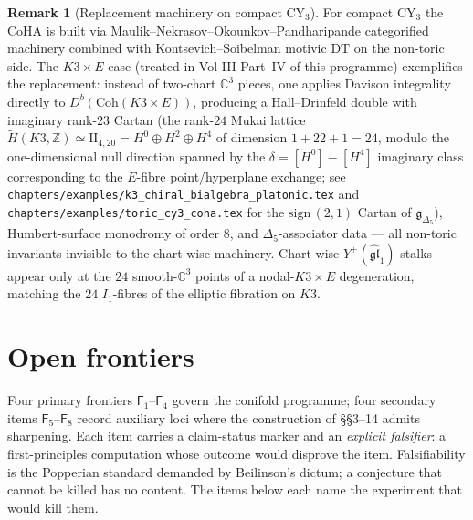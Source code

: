 \documentclass[11pt]{amsart}
\theoremstyle{definition}
\newtheorem{remark}[theorem]{Remark}
\providecommand{\bC}{\mathbb{C}}
\providecommand{\Z}{\mathbb{Z}}
\providecommand{\fgl}{\mathfrak{gl}}
\providecommand{\fg}{\mathfrak{g}}
\begin{document}
\begin{remark}[Replacement machinery on compact CY$_3$]
\label{rem:mnop-replacement}
For compact CY$_3$ the CoHA is built via Maulik--Nekrasov--Okounkov--Pandharipande
categorified machinery combined with Kontsevich--Soibelman motivic DT
on the non-toric side. The $K3 \times E$ case (treated in Vol III Part~IV
of this programme) exemplifies the replacement: instead of two-chart
$\bC^3$ pieces, one applies Davison integrality directly to
$D^b(\mathrm{Coh}(K3 \times E))$, producing a Hall--Drinfeld double with
imaginary rank-$23$ Cartan (the rank-$24$ Mukai lattice $\widetilde H(K3,\Z)
\simeq \mathrm{II}_{4,20} = H^0 \oplus H^2 \oplus H^4$ of dimension $1 + 22 + 1 = 24$,
modulo the one-dimensional null direction spanned by the
$\delta = [H^0] - [H^4]$ imaginary class corresponding to the
$E$-fibre point/hyperplane exchange; see
\texttt{chapters/examples/k3\_chiral\_bialgebra\_platonic.tex} and
\texttt{chapters/examples/toric\_cy3\_coha.tex} for the
$\mathrm{sign}\,(2,1)$ Cartan of $\fg_{\Delta_5}$), Humbert-surface monodromy
of order $8$, and
$\Delta_5$-associator data — all non-toric invariants invisible to the
chart-wise machinery. Chart-wise $Y^+(\widehat{\fgl}_1)$ stalks appear
only at the $24$ smooth-$\bC^3$ points of a nodal-$K3 \times E$
degeneration, matching the $24$ $I_1$-fibres of the elliptic fibration on
$K3$.
\end{remark}

\section{Open frontiers}
\label{sec:open-frontiers}

Four primary frontiers $\mathsf F_{1}$--$\mathsf F_{4}$ govern the
conifold programme; four secondary items $\mathsf F_{5}$--$\mathsf F_{8}$
record auxiliary loci where the construction of §§3--14 admits
sharpening. Each item carries a claim-status marker and an
\emph{explicit falsifier}: a first-principles computation whose outcome
would disprove the item. Falsifiability is the Popperian standard
demanded by Beilinson's dictum; a conjecture that cannot be killed has
no content. The items below each name the experiment that would kill
them.
\end{document}
